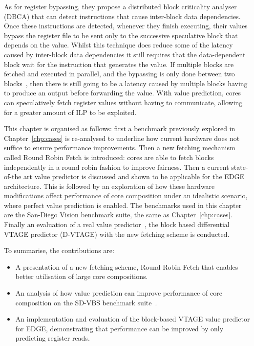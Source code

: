 As for register bypassing, they propose a distributed block criticality analyser (DBCA) that can detect instructions that cause inter-block data dependencies.
Once these instructions are detected, whenever they finish executing, their values bypass the register file to be sent only to the successive speculative block that depends on the value.
Whilst this technique does reduce some of the latency caused by inter-block data dependencies it still requires that the data-dependent block wait for the instruction that generates the value.
If multiple blocks are fetched and executed in parallel, and the bypassing is only done between two blocks~\cite{robatmili2011uniproc}, then there is still going to be a latency caused by multiple blocks having to produce an output before forwarding the value.
With value prediction, cores can speculatively fetch register values without having to communicate, allowing for a greater amount of ILP to be exploited.

This chapter is organised as follows: first a benchmark previously explored in Chapter~\ref{chp:cases} is re-analysed to underline how current hardware does not suffice to ensure performance improvements.
Then a new fetching mechanism called Round Robin Fetch is introduced: cores are able to fetch blocks independently in a round robin fashion to improve fairness.
Then a current state-of-the art value predictor is discussed and shown to be applicable for the EDGE architecture.
This is followed by an exploration of how these hardware modifications affect performance of core composition under an idealistic scenario, where perfect value prediction is enabled.
The benchmarks used in this chapter are the San-Diego Vision benchmark suite, the same as Chapter~\ref{chp:cases}.
Finally an evaluation of a real value predictor~\cite{peraisBeBop2015}, the block based differential VTAGE predictor (D-VTAGE) with the new fetching scheme is conducted.

To summarise, the contributions are:

\begin{itemize}
\item A presentation of a new fetching scheme, Round Robin Fetch that enables better utilisation of large core compositions.
\vspace{-1em}
\item An analysis of how value prediction can improve performance of core composition on the SD-VBS benchmark suite~\cite{sdvbs}.
\vspace{-1em}
\item An implementation and evaluation of the block-based VTAGE value predictor for EDGE, demonstrating that performance can be improved by only predicting register reads.
\end{itemize}
